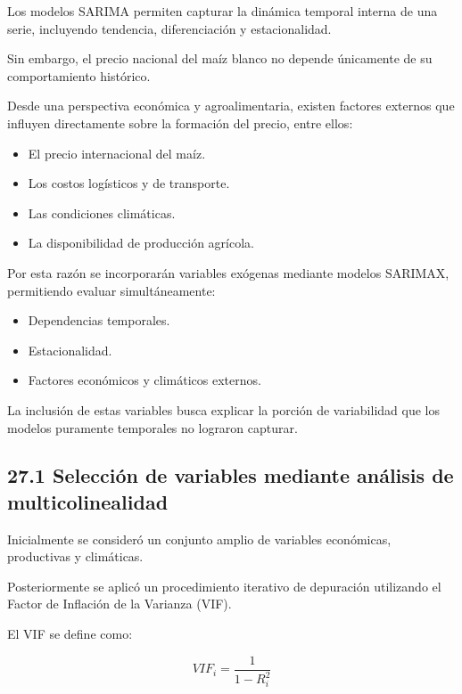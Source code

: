 \documentclass[11pt]{article}
\providecommand{\tightlist}{%
      \setlength{\itemsep}{0pt}\setlength{\parskip}{0pt}}
\begin{document}
Los modelos SARIMA permiten capturar la dinámica temporal interna de una
serie, incluyendo tendencia, diferenciación y estacionalidad.

Sin embargo, el precio nacional del maíz blanco no depende únicamente de
su comportamiento histórico.

Desde una perspectiva económica y agroalimentaria, existen factores
externos que influyen directamente sobre la formación del precio, entre
ellos:

\begin{itemize}
\tightlist
\item
  El precio internacional del maíz.
\item
  Los costos logísticos y de transporte.
\item
  Las condiciones climáticas.
\item
  La disponibilidad de producción agrícola.
\end{itemize}

Por esta razón se incorporarán variables exógenas mediante modelos
SARIMAX, permitiendo evaluar simultáneamente:

\begin{itemize}
\tightlist
\item
  Dependencias temporales.
\item
  Estacionalidad.
\item
  Factores económicos y climáticos externos.
\end{itemize}

La inclusión de estas variables busca explicar la porción de
variabilidad que los modelos puramente temporales no lograron capturar.

    \hypertarget{selecciuxf3n-de-variables-mediante-anuxe1lisis-de-multicolinealidad}{%
\subsection{27.1 Selección de variables mediante análisis de
multicolinealidad}\label{selecciuxf3n-de-variables-mediante-anuxe1lisis-de-multicolinealidad}}

Inicialmente se consideró un conjunto amplio de variables económicas,
productivas y climáticas.

Posteriormente se aplicó un procedimiento iterativo de depuración
utilizando el Factor de Inflación de la Varianza (VIF).

El VIF se define como:

\[
VIF_i =
\frac{1}
{1-R_i^2}
\]
\end{document}
